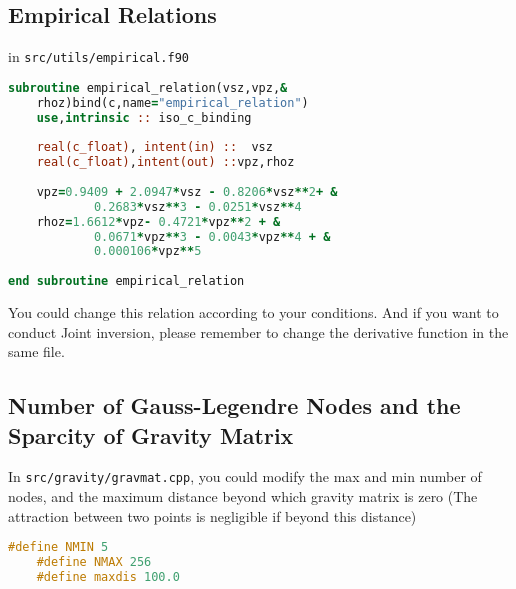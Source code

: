 \documentclass[UTF8]{article}
\begin{document}
    \subsection{Empirical Relations}
    in \verb!src/utils/empirical.f90! 
\begin{lstlisting}[language=fortran]
subroutine empirical_relation(vsz,vpz,&
    rhoz)bind(c,name="empirical_relation")
    use,intrinsic :: iso_c_binding
    
    real(c_float), intent(in) ::  vsz
    real(c_float),intent(out) ::vpz,rhoz
    
    vpz=0.9409 + 2.0947*vsz - 0.8206*vsz**2+ &
            0.2683*vsz**3 - 0.0251*vsz**4
    rhoz=1.6612*vpz- 0.4721*vpz**2 + &
            0.0671*vpz**3 - 0.0043*vpz**4 + & 
            0.000106*vpz**5
    
end subroutine empirical_relation
\end{lstlisting}
    You could change this relation according to your conditions. And if you want to conduct
    Joint inversion, please remember to change the derivative function in the same file.

    \subsection{Number of Gauss-Legendre Nodes and the Sparcity of Gravity Matrix}
    In \verb!src/gravity/gravmat.cpp!, you could modify the max and min number of nodes,
    and the maximum distance beyond which gravity matrix is zero (The attraction between two 
    points is negligible if beyond this distance)
    \begin{lstlisting}[language=c++]
    #define NMIN 5
    #define NMAX 256
    #define maxdis 100.0 
    \end{lstlisting}
\end{document}
